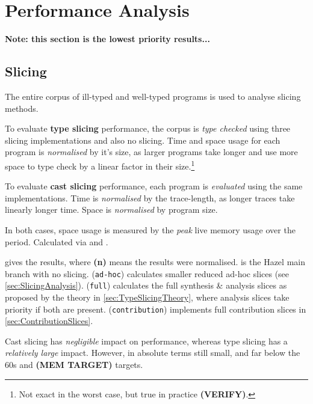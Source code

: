 \section{Performance Analysis}\label{sec:PerformanceAnalysis}
\textbf{Note: this section is the lowest priority results...}

\subsection{Slicing}
The entire corpus of ill-typed and well-typed programs is used to analyse slicing methods. 

To evaluate \textbf{type slicing} performance, the corpus is \textit{type checked} using three slicing implementations and also no slicing. Time and space usage for each program is \textit{normalised} by it's size, as larger programs take longer and use more space to type check by a linear factor in their size.\footnote{Not exact in the worst case, but true in practice \textbf{(VERIFY)}.}

To evaluate \textbf{cast slicing} performance, each program is \textit{evaluated} using the same implementations. Time is \textit{normalised} by the trace-length, as longer traces take linearly longer time. Space is \textit{normalised} by program size.

In both cases, space usage is measured by the \textit{peak} live memory usage over the period. Calculated via  and .

 gives the results, where \textbf{(n)} means the results were normalised.  is the Hazel main branch with no slicing.  (\texttt{ad-hoc}) calculates smaller reduced ad-hoc slices (see \cref{sec:SlicingAnalysis}).  (\texttt{full}) calculates the full synthesis \& analysis slices as proposed by the theory in \cref{sec:TypeSlicingTheory}, where analysis slices take priority if both are present.  (\texttt{contribution}) implements full contribution slices in \cref{sec:ContributionSlices}.

Cast slicing has \textit{negligible} impact on performance, whereas type slicing has a \textit{relatively large} impact. However, in absolute terms still small, and far below the 60s and \textbf{(MEM TARGET)} targets.


